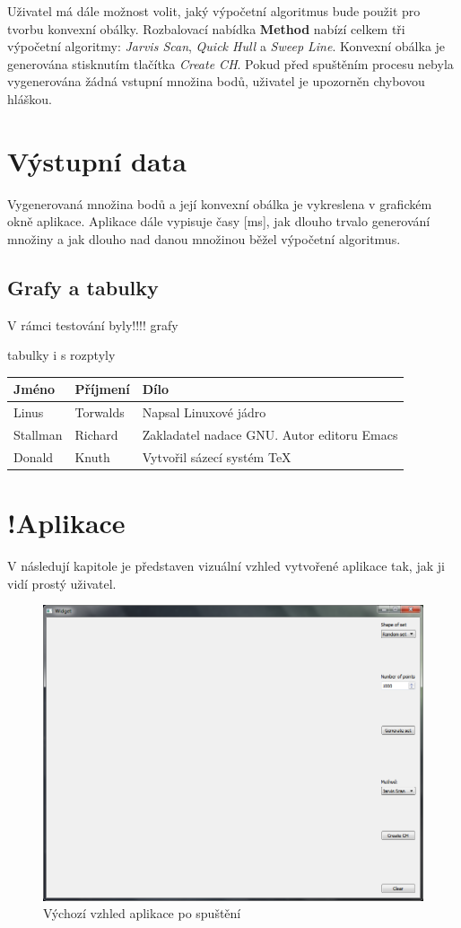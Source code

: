 \documentclass[a4paper, 12pt]{article}
\begin{document}
Uživatel má dále možnost volit, jaký výpočetní algoritmus bude použit pro tvorbu konvexní obálky. Rozbalovací nabídka \textbf{Method} nabízí celkem tři výpočetní algoritmy: \textit{Jarvis Scan}, \textit{Quick Hull} a \textit{Sweep Line}. Konvexní obálka je generována stisknutím tlačítka \textsl{Create CH}. Pokud před spuštěním procesu nebyla vygenerována žádná vstupní množina bodů, uživatel je upozorněn chybovou hláškou. 

\section{Výstupní data}
Vygenerovaná množina bodů a její konvexní obálka je vykreslena v grafickém okně aplikace. Aplikace dále vypisuje časy [ms], jak dlouho trvalo generování množiny a jak dlouho nad danou množinou běžel výpočetní algoritmus.

\subsection{Grafy a tabulky}
V rámci testování byly!!!!
grafy

tabulky i s rozptyly


\begin{tabular}{ | l | l | p{5cm} |}
	\hline
    Jméno    & Příjmení  & Dílo                                       \\ \hline
    Linus    & Torwalds  & Napsal Linuxové jádro                      \\ \hline  
    Stallman & Richard   & Zakladatel nadace GNU. Autor editoru Emacs \\ \hline
    Donald   & Knuth     & Vytvořil sázecí systém \TeX{}              \\ \hline  
\end{tabular}


\clearpage
\section{!Aplikace}
V následují kapitole je představen vizuální vzhled vytvořené aplikace tak, jak ji vidí prostý uživatel.

\begin{figure}[h!]
	\centering
	\includegraphics[width=11.5cm]{./pictures/app_default.png}
	\caption{Výchozí vzhled aplikace po spuštění}
\end{figure}
\end{document}
